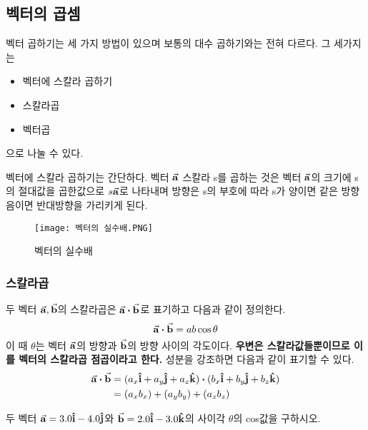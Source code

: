 \begin{flushleft}
\begin{task}
  \end{task}

\subsection{벡터의 곱셈}

벡터 곱하기는 세 가지 방법이 있으며 보통의 대수 곱하기와는 전혀 다르다. 그 세가지는 
\begin{itemize}
\item 벡터에 스칼라 곱하기
\item 스칼라곱 
\item 벡터곱 
\end{itemize}
으로 나눌 수 있다. 

벡터에 스칼라 곱하기는 간단하다. 
벡터 $\va{a}$ 스칼라 s를 곱하는 것은 벡터 $\va{a}$의 크기에 s의 절대값을 곱한값으로 $s\va{a}$로 나타내며 방향은 
s의 부호에 따라 s가 양이면 같은 방향 음이면 반대방향을 가리키게 된다. 

\begin{figure}[h]
  \centering
  \texttt{[image: 벡터의 실수배.PNG]}
  \caption{벡터의 실수배}
\end{figure}

\subsubsection{스칼라곱}
두 벡터 $\va{a}, \va{b}$의 스칼라곱은 $\va{a}\vdot\va{b}$로 표기하고 다음과 같이 정의한다. 
\begin{equation}
  \va{a}\vdot\va{b}=ab\cos\theta
\end{equation}
이 때 $\theta$는 벡터 $\va{a}$의 방향과 $\va{b}$의 방향 사이의 각도이다. \textbf{우변은 스칼라값들뿐이므로 이를 벡터의 스칼라곱
점곱이라고 한다.} 성분을 강조하면 다음과 같이 표기할 수 있다. 
\begin{equation}
  \begin{split}
    \va{a}\vdot\va{b}&= (a_x\vu{i}+a_y\vu{j}+a_z\vu{k}) \vdot (b_x\vu{i}+b_y\vu{j}+b_z\vu{k}) 
  \\& = (a_x b_x)+(a_y b_y)+ (a_z b_z)
  \end{split}
\end{equation}

\begin{task}
두 벡터 $\va{a}=3.0\vu{i}-4.0\vu{j}$와 $\va{b}=2.0\vu{i}-3.0\vu{k}$의 사이각 $\theta$의 cos값을 구하시오.

\end{task}





\end{flushleft}
